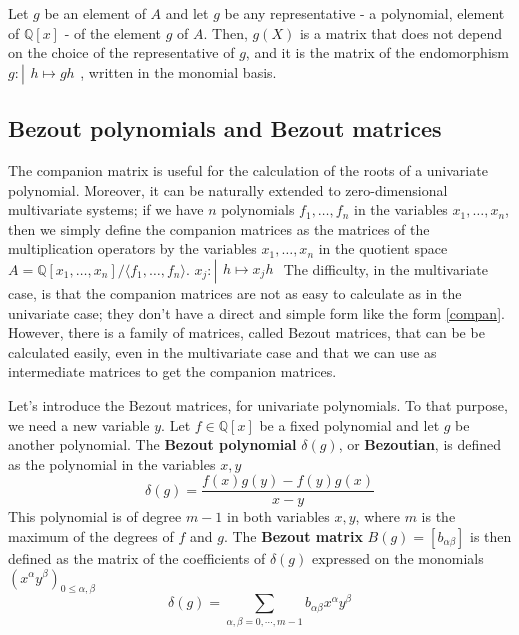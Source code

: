 \documentclass{standalone}
\begin{document}
\begin{prop}
Let $g$ be an element of $A$ and let $g$ be any representative - a polynomial, element of $\mathbb{Q}[x]$ - of the element $g$ of $A$. Then, $g(X)$ is a matrix that does not depend on the choice of the representative of $g$, and it is the matrix of the endomorphism
$g:\left\vert
\begin{array}{c}
h \mapsto gh
\end{array}
\right.$,
written in the monomial basis.
\end{prop}


\subsection{Bezout polynomials and Bezout matrices}

\begin{defn}
\label{def_bez}
The companion matrix is useful for the calculation of the roots of a univariate polynomial. Moreover, it can be naturally extended to zero-dimensional multivariate systems; if we have $n$ polynomials $f_1, \ldots, f_n$ in the variables $x_1, \ldots, x_n$, then we simply define the companion matrices as the matrices of the multiplication operators by the variables $x_1, \ldots, x_n$ in the quotient space $ A = \mathbb{Q}[x_1, \ldots, x_n]/ \langle f_1, \ldots, f_n\rangle$.
$x_j : \left\vert
\begin{array}{c}
h \mapsto x_jh
\end{array}
\right.$
The difficulty, in the multivariate case, is that the companion matrices are not as easy to calculate as in the univariate case; they don't have a direct and simple form like the form \ref{compan}. However, there is a family of matrices, called Bezout matrices, that can be be calculated easily, even in the multivariate case and that we can use as intermediate matrices to get the companion matrices.

Let's introduce the Bezout matrices, for univariate polynomials. To that purpose, we need a new variable $y$. Let $f \in \mathbb{Q}[x]$ be a fixed polynomial and let $g$ be another polynomial. The {\bf Bezout polynomial} $\delta(g)$, or {\bf Bezoutian},
is defined as the polynomial in the variables $x, y$
$$
\delta(g) = \dfrac{f(x)g(y)-f(y)g(x)}{x-y}
$$
This polynomial is of degree $m-1$ in both variables $x, y$, where $m$ is the maximum of the degrees of $f$ and $g$. The {\bf Bezout matrix} $B(g) = [b_{\alpha\beta}]$ is then defined as the matrix of the coefficients of $\delta(g)$ expressed on the monomials $(x^\alpha y^\beta)_{0 \le \alpha,\beta}$
\begin{equation}
\delta(g) = \sum_{\alpha,\beta = 0, \cdots, m-1} b_{\alpha\beta} x^\alpha y^\beta
\end{equation}
\end{defn}
\end{document}
